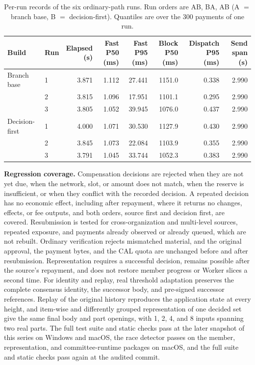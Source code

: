 \begin{table}[t]
  \caption{Per-run records of the six ordinary-path runs. Run orders are
    AB, BA, AB (A $=$ branch base, B $=$ decision-first).
    Quantiles are over the 300 payments of one run.}
  \label{tab:supp-cost}
  \centering
  \small
  \setlength{\tabcolsep}{4pt}
  \begin{tabular}{@{}llrrrrrr@{}}
    \toprule
    Build & Run & \shortstack{Elapsed\\(s)} & \shortstack{Fast P50\\(ms)} & \shortstack{Fast P95\\(ms)}
      & \shortstack{Block P50\\(ms)} & \shortstack{Dispatch P95\\(ms)} & \shortstack{Send span\\(s)} \\
    \midrule
    Branch base & 1 & 3.871 & 1.112 & 27.441 & 1151.0 & 0.338 & 2.990 \\
     & 2 & 3.815 & 1.096 & 17.951 & 1101.1 & 0.295 & 2.990 \\
     & 3 & 3.805 & 1.052 & 39.945 & 1076.0 & 0.437 & 2.990 \\
    \addlinespace
    Decision-first & 1 & 4.000 & 1.071 & 30.530 & 1127.9 & 0.430 & 2.990 \\
     & 2 & 3.845 & 1.073 & 22.084 & 1103.9 & 0.355 & 2.990 \\
     & 3 & 3.791 & 1.045 & 33.744 & 1052.3 & 0.383 & 2.990 \\
    \bottomrule
  \end{tabular}
\end{table}

\noindent\textbf{Regression coverage.}
Compensation decisions are rejected when they are not yet due, when the
network, slot, or amount does not match, when the reserve is insufficient, or
when they conflict with the recorded decision. A repeated decision has no
economic effect, including after repayment, where it returns no changes,
effects, or fee outputs, and both orders, source first and decision first, are
covered. Resubmission is tested for cross-organization and multi-level
sources, repeated exposure, and payments already observed or already queued,
which are not rebuilt. Ordinary verification rejects mismatched material, and
the original approval, the payment bytes, and the CAL quota are unchanged
before and after resubmission. Representation requires a successful decision,
remains possible after the source's repayment, and does not restore member
progress or Worker slices a second time. For identity and replay, real
threshold adaptation preserves the complete consensus identity, the successor
body, and pre-signed successor references. Replay of the original history
reproduces the application state at every height, and item-wise and
differently grouped representation of one decided set give the same final
body and part openings, with 1, 2, 4, and 8 inputs spanning two real parts.
The full test suite and static checks pass at the later snapshot of this series on Windows
and macOS, the race detector passes on the member, representation, and
committee-runtime packages on macOS, and the full suite and static checks pass
again at the audited commit.

